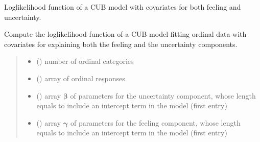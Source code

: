 \documentclass[letterpaper,10pt,english]{sphinxmanual}
\begin{document}
\begin{fulllineitems}
\label{\detokenize{cubmods:cubmods.cub_yw.loglik}}
\pysigstartsignatures
{}
\pysigstopsignatures
\sphinxAtStartPar
Log\sphinxhyphen{}likelihood function of a CUB model with covariates for both feeling and uncertainty.

\sphinxAtStartPar
Compute the log\sphinxhyphen{}likelihood function of a CUB model fitting ordinal data
with covariates for explaining both the feeling and the uncertainty components.
\begin{quote}\begin{description}
\begin{itemize}
\item {} 
\sphinxAtStartPar
{} () \textendash{} number of ordinal categories

\item {} 
\sphinxAtStartPar
{} () \textendash{} array of ordinal responses

\item {} 
\sphinxAtStartPar
{} () \textendash{} array \(\pmb \beta\) of parameters for the uncertainty component, whose length equals 
 to include an intercept term in the model (first entry)

\item {} 
\sphinxAtStartPar
{} () \textendash{} array \(\pmb \gamma\) of parameters for the feeling component, whose length equals 
 to include an intercept term in the model (first entry)


\end{itemize}
\end{description}
\end{quote}
\end{fulllineitems}
\end{document}

